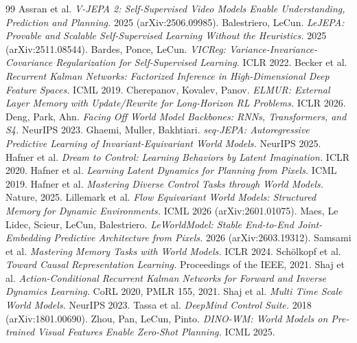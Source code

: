 \begin{thebibliography}{99}\small
{} Assran et al. \emph{V-JEPA 2: Self-Supervised Video Models Enable Understanding, Prediction and Planning.} 2025 (arXiv:2506.09985).
 Balestriero, LeCun. \emph{LeJEPA: Provable and Scalable Self-Supervised Learning Without the Heuristics.} 2025 (arXiv:2511.08544).
 Bardes, Ponce, LeCun. \emph{VICReg: Variance-Invariance-Covariance Regularization for Self-Supervised Learning.} ICLR 2022.
 Becker et al. \emph{Recurrent Kalman Networks: Factorized Inference in High-Dimensional Deep Feature Spaces.} ICML 2019.
 Cherepanov, Kovalev, Panov. \emph{ELMUR: External Layer Memory with Update/Rewrite for Long-Horizon RL Problems.} ICLR 2026.
 Deng, Park, Ahn. \emph{Facing Off World Model Backbones: RNNs, Transformers, and S4.} NeurIPS 2023.
 Ghaemi, Muller, Bakhtiari. \emph{seq-JEPA: Autoregressive Predictive Learning of Invariant-Equivariant World Models.} NeurIPS 2025.
 Hafner et al. \emph{Dream to Control: Learning Behaviors by Latent Imagination.} ICLR 2020.
 Hafner et al. \emph{Learning Latent Dynamics for Planning from Pixels.} ICML 2019.
 Hafner et al. \emph{Mastering Diverse Control Tasks through World Models.} Nature, 2025.
 Lillemark et al. \emph{Flow Equivariant World Models: Structured Memory for Dynamic Environments.} ICML 2026 (arXiv:2601.01075).
 Maes, Le Lidec, Scieur, LeCun, Balestriero. \emph{LeWorldModel: Stable End-to-End Joint-Embedding Predictive Architecture from Pixels.} 2026 (arXiv:2603.19312).
 Samsami et al. \emph{Mastering Memory Tasks with World Models.} ICLR 2024.
 Schölkopf et al. \emph{Toward Causal Representation Learning.} Proceedings of the IEEE, 2021.
 Shaj et al. \emph{Action-Conditional Recurrent Kalman Networks for Forward and Inverse Dynamics Learning.} CoRL 2020, PMLR 155, 2021.
 Shaj et al. \emph{Multi Time Scale World Models.} NeurIPS 2023.
 Tassa et al. \emph{DeepMind Control Suite.} 2018 (arXiv:1801.00690).
 Zhou, Pan, LeCun, Pinto. \emph{DINO-WM: World Models on Pre-trained Visual Features Enable Zero-Shot Planning.} ICML 2025.
\end{thebibliography}
